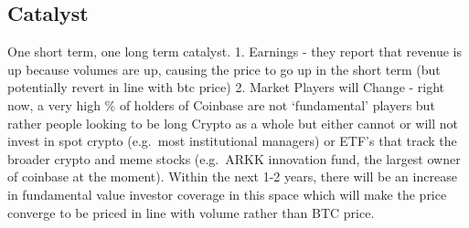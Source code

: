 \documentclass[
]{article}
\begin{document}
\hypertarget{catalyst}{%
\subsection{Catalyst}\label{catalyst}}

One short term, one long term catalyst. 1. Earnings - they report that
revenue is up because volumes are up, causing the price to go up in the
short term (but potentially revert in line with btc price) 2. Market
Players will Change - right now, a very high \% of holders of Coinbase
are not `fundamental' players but rather people looking to be long
Crypto as a whole but either cannot or will not invest in spot crypto
(e.g.~most institutional managers) or ETF's that track the broader
crypto and meme stocks (e.g.~ARKK innovation fund, the largest owner of
coinbase at the moment). Within the next 1-2 years, there will be an
increase in fundamental value investor coverage in this space which will
make the price converge to be priced in line with volume rather than BTC
price.
\end{document}
